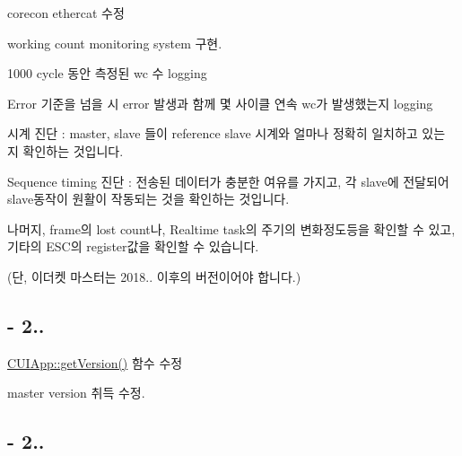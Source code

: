 \begin{DoxyEnumerate}
\item corecon ethercat 수정
\begin{DoxyItemize}
\item working count monitoring system 구현.
\item 1000 cycle 동안 측정된 wc 수 logging
\item Error 기준을 넘을 시 error 발생과 함께 몇 사이클 연속 wc가 발생했는지 logging
\end{DoxyItemize}
\item 시계 진단 \-: master, slave 들이 reference slave 시계와 얼마나 정확히 일치하고 있는 지 확인하는 것입니다. 
\item Sequence timing 진단 \-: 전송된 데이터가 충분한 여유를 가지고, 각 slave에 전달되어 slave동작이 원활이 작동되는 것을 확인하는 것입니다.
\begin{DoxyItemize}
\item 나머지, frame의 lost count나, Realtime task의 주기의 변화정도등을 확인할 수 있고, 기타의 E\-S\-C의 register값을 확인할 수 있습니다.
\item (단, 이더켓 마스터는 2018.. 이후의 버전이어야 합니다.) 
\end{DoxyItemize}
\end{DoxyEnumerate}

\subsection*{-\/ 2..}


\begin{DoxyEnumerate}
\item \hyperlink{classCUIApp_a6c61ac6cf4cf719bad5459bbefc37659}{C\-U\-I\-App\-::get\-Version()} 함수 수정
\begin{DoxyItemize}
\item master version 취득 수정.
\end{DoxyItemize}
\end{DoxyEnumerate}

\subsection*{-\/ 2..}


